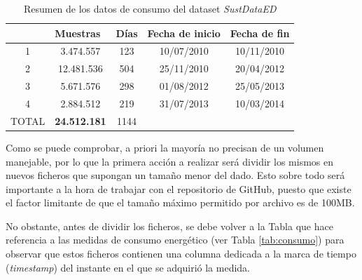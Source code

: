 \begin{table}[h!]
  \centering
  \begin{tabular}{c|c|c|cc}
  \hline
  \rowcolor[HTML]{C0C0C0} 
  \multicolumn{1}{|l|}{\cellcolor[HTML]{C0C0C0}Despliegue} & \multicolumn{1}{l|}{\cellcolor[HTML]{C0C0C0}Muestras} & \multicolumn{1}{l|}{\cellcolor[HTML]{C0C0C0}Días} & \multicolumn{1}{l|}{\cellcolor[HTML]{C0C0C0}Fecha de inicio} & \multicolumn{1}{l|}{\cellcolor[HTML]{C0C0C0}Fecha de fin} \\ \hline
  \multicolumn{1}{|c|}{1} & 3.474.557 & 123 & \multicolumn{1}{c|}{10/07/2010} & \multicolumn{1}{c|}{10/11/2010} \\ \hline
  \multicolumn{1}{|c|}{2} & 12.481.536 & 504 & \multicolumn{1}{c|}{25/11/2010} & \multicolumn{1}{c|}{20/04/2012} \\ \hline
  \multicolumn{1}{|c|}{3} & 5.671.576 & 298 & \multicolumn{1}{c|}{01/08/2012} & \multicolumn{1}{c|}{25/05/2013} \\ \hline
  \multicolumn{1}{|c|}{4} & 2.884.512 & 219 & \multicolumn{1}{c|}{31/07/2013} & \multicolumn{1}{c|}{10/03/2014} \\ \hline
  \multicolumn{1}{|c|}{\cellcolor[HTML]{EFEFEF}TOTAL} & \multicolumn{1}{c|}{\cellcolor[HTML]{EFEFEF}\textbf{24.512.181}} & \multicolumn{1}{c|}{\cellcolor[HTML]{EFEFEF}1144} & \multicolumn{1}{l}{} & \multicolumn{1}{l}{} \\ \cline{1-3}
  \end{tabular}
  \caption{Resumen de los datos de consumo del dataset \textit{SustDataED} \cite{sustdata}}
  \label{tab:resumen}
\end{table}

\vspace{3mm}

Como se puede comprobar, a priori la mayoría no precisan de un volumen manejable, por lo que la primera acción a realizar será dividir los mismos en nuevos ficheros que supongan un tamaño menor del dado. Esto sobre todo será importante a la hora de trabajar con el repositorio de GitHub, puesto que existe el factor limitante de que el tamaño máximo permitido por archivo es de 100MB.

\pagebreak

No obstante, antes de dividir los ficheros, se debe volver a la Tabla que hace referencia a las medidas de consumo energético (ver Tabla \ref{tab:consumo}) para observar que estos ficheros contienen una columna dedicada a la marca de tiempo (\textit{timestamp}) del instante en el que se adquirió la medida. 

